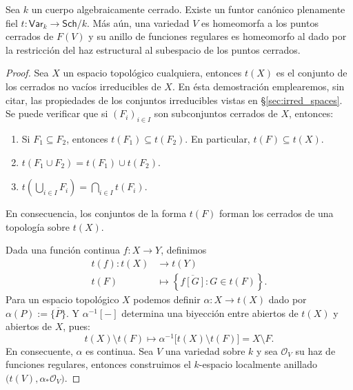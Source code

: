 \begin{thm}\label{thm:sch_extendend_vars}
	Sea $k$ un cuerpo algebraicamente cerrado.
	Existe un funtor canónico plenamente fiel $t \colon \mathsf{Var}_k \to \mathsf{Sch}/k$.
	Más aún, una variedad $V$ es homeomorfa a los puntos cerrados de $F(V)$ y su anillo de funciones regulares
	es homeomorfo al dado por la restricción del haz estructural al subespacio de los puntos cerrados.
\end{thm}
\begin{proof}
	Sea $X$ un espacio topológico cualquiera, entonces $t(X)$ es el conjunto de los cerrados no vacíos irreducibles de $X$.
	En ésta demostración emplearemos, sin citar, las propiedades de los conjuntos irreducibles vistas en \S\ref{sec:irred_spaces}.
	Se puede verificar que si $(F_i)_{i\in I}$ son subconjuntos cerrados de $X$, entonces:
	\begin{enumerate}
		\item Si $F_1 \subseteq F_2$, entonces $t(F_1) \subseteq t(F_2)$. En particular, $t(F) \subseteq t(X)$.
		\item $t(F_1 \cup F_2 ) = t(F_1) \cup t(F_2)$.
		\item $t\left( \bigcup_{i\in I} F_i \right) = \bigcap_{i\in I} t(F_i)$.
	\end{enumerate}
	En consecuencia, los conjuntos de la forma $t(F)$ forman los cerrados de una topología sobre $t(X)$.

	Dada una función continua $f \colon X \to Y$, definimos
	\begin{align*}
		t(f) \colon t(X) &\longrightarrow t(Y) \\
		t(F) &\longmapsto \left\{ \overline{f[G]} : G \in t(F) \right\}.
	\end{align*}
	Para un espacio topológico $X$ podemos definir $\alpha \colon X \to t(X)$ dado por $\alpha(P) := \overline{\{ P \}}$.
	Y $\alpha^{-1}[-]$ determina una biyección entre abiertos de $t(X)$ y abiertos de $X$, pues:
	$$ t(X) \setminus t(F ) \longmapsto \alpha^{-1}\big[ t(X) \setminus t(F ) \big] = X \setminus F. $$
	En consecuente, $\alpha$ es continua.
	Sea $V$ una variedad sobre $k$ y sea $\mathscr{O}_V$ su haz de funciones regulares, entonces construimos el $k$-espacio localmente anillado
	$\big( t(V), \alpha_*\mathscr{O}_V \big)$.


\end{proof}
